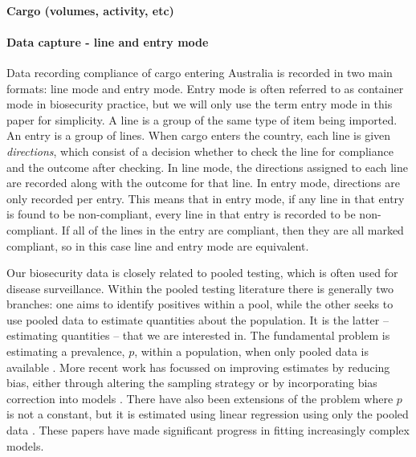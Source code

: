 \documentclass{article}
\begin{document}
\paragraph{Cargo (volumes, activity, etc)}

\paragraph{Data capture - line and entry mode}
Data recording compliance of cargo entering Australia is recorded in two main formats: line mode and entry mode. Entry mode is often referred to as container mode in biosecurity practice, but we will only use the term entry mode in this paper for simplicity. A line is a group of the same type of item being imported. An entry is a group of lines. When cargo enters the country, each line is given \emph{directions}, which consist of a decision whether to check the line for compliance and the outcome after checking. In line mode, the directions assigned to each line are recorded along with the outcome for that line. In entry mode, directions are only recorded per entry. This means that in entry mode, if any line in that entry is found to be non-compliant, every line in that entry is recorded to be non-compliant. If all of the lines in the entry are compliant, then they are all marked compliant, so in this case line and entry mode are equivalent.

Our biosecurity data is closely related to pooled testing, which is often used for disease surveillance. Within the pooled testing literature there is generally two branches: one aims to identify positives within a pool, while the other seeks to use pooled data to estimate quantities about the population. It is the latter -- estimating quantities -- that we are interested in. The fundamental problem is estimating a prevalence, \(p\), within a population, when only pooled data is available \citep{thompson_estimation_1962}. More recent work has focussed on improving estimates by reducing bias, either through altering the sampling strategy \citep{schaarschmidt_experimental_2007,hepworth_debiased_2009} or by incorporating bias correction into models  \citep{hepworth_bias_2017,hepworth_bias_2021}. There have also been extensions of the problem where \(p\) is not a constant, but it is estimated using linear regression using only the pooled data \citep{delaigle_nonparametric_2015, chatterjee_regression_2020, mcmahan_bayesian_2017, liu_generalized_2020}. These papers have made significant progress in fitting increasingly complex models.
\end{document}
